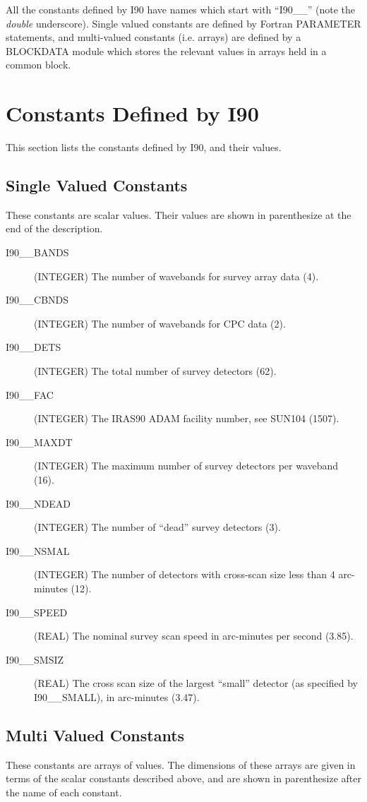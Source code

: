 All the constants defined by I90 have names which start with ``I90\_\_''
(note the {\em double} underscore). Single valued constants are defined by
Fortran PARAMETER statements, and multi-valued constants (i.e. arrays) are
defined by a BLOCKDATA module which stores the relevant values in arrays held in
a common block. \footnotemark
{}

\section{Constants Defined by I90}

This section lists the constants defined by I90, and their values.
\subsection{Single Valued Constants}
These constants are scalar values. Their values are shown in parenthesize at the
end of the description.
\begin{description}
\item [I90\_\_BANDS] (INTEGER) The number of wavebands for survey array data (4).
\item [I90\_\_CBNDS] (INTEGER) The number of wavebands for CPC data (2).
\item [I90\_\_DETS]  (INTEGER) The total number of survey detectors (62).
\item [I90\_\_FAC]   (INTEGER) The IRAS90 ADAM facility number, see SUN104 (1507).
\item [I90\_\_MAXDT] (INTEGER) The maximum number of survey detectors per
waveband (16).
\item [I90\_\_NDEAD] (INTEGER) The number of ``dead'' survey detectors (3).
\item [I90\_\_NSMAL] (INTEGER) The number of detectors with cross-scan size less
than 4 arc-minutes (12).
\item [I90\_\_SPEED] (REAL) The nominal survey scan speed in arc-minutes per
second (3.85).
\item [I90\_\_SMSIZ] (REAL) The cross scan size of the largest ``small''
detector (as specified by I90\_\_SMALL), in arc-minutes (3.47).
\end{description}

\newpage
\subsection{Multi Valued Constants}
These constants are arrays of values. The dimensions of these arrays are given
in terms of the scalar constants described above, and are shown in parenthesize
after the name of each constant.

